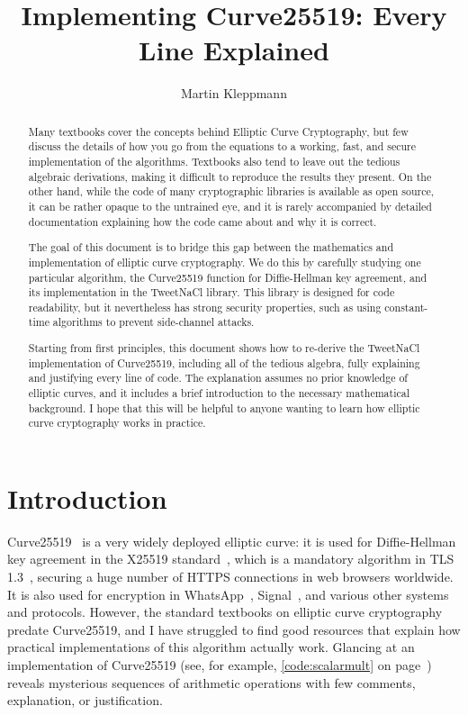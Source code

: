 \documentclass{article}
\begin{document}
\def\listingautorefname{Listing}%
\def\sectionautorefname{Section}%
\def\subsectionautorefname{Section}%
\def\subsubsectionautorefname{Section}%

\title{Implementing Curve25519: Every Line Explained}
\author{Martin Kleppmann}
\date{}
\maketitle
\begin{abstract}
Many textbooks cover the concepts behind Elliptic Curve Cryptography, but few discuss the details of how you go from the equations to a working, fast, and secure implementation of the algorithms.
Textbooks also tend to leave out the tedious algebraic derivations, making it difficult to reproduce the results they present.
On the other hand, while the code of many cryptographic libraries is available as open source, it can be rather opaque to the untrained eye, and it is rarely accompanied by detailed documentation explaining how the code came about and why it is correct.

The goal of this document is to bridge this gap between the mathematics and implementation of elliptic curve cryptography.
We do this by carefully studying one particular algorithm, the Curve25519 function for Diffie-Hellman key agreement, and its implementation in the TweetNaCl library.
This library is designed for code readability, but it nevertheless has strong security properties, such as using constant-time algorithms to prevent side-channel attacks.

Starting from first principles, this document shows how to re-derive the TweetNaCl implementation of Curve25519, including all of the tedious algebra, fully explaining and justifying every line of code.
The explanation assumes no prior knowledge of elliptic curves, and it includes a brief introduction to the necessary mathematical background.
I hope that this will be helpful to anyone wanting to learn how elliptic curve cryptography works in practice.
\end{abstract}

\section{Introduction}

Curve25519~\cite{Bernstein:2006kw} is a very widely deployed elliptic curve: it is used for Diffie-Hellman key agreement in the X25519 standard~\cite{X25519}, which is a mandatory algorithm in TLS 1.3~\cite{TLS13}, securing a huge number of HTTPS connections in web browsers worldwide.
It is also used for encryption in WhatsApp~\cite{WhatsAppWhitepaper}, Signal~\cite{Marlinspike:2016}, and various other systems and protocols.
However, the standard textbooks on elliptic curve cryptography \cite{Blake:1999,Cohen:2006,Hankerson:2004,Koblitz:1994} predate Curve25519, and I have struggled to find good resources that explain how practical implementations of this algorithm actually work.
Glancing at an implementation of Curve25519 (see, for example, \autoref{code:scalarmult} on page~\pageref{code:scalarmult}) reveals mysterious sequences of arithmetic operations with few comments, explanation, or justification.
\end{document}
